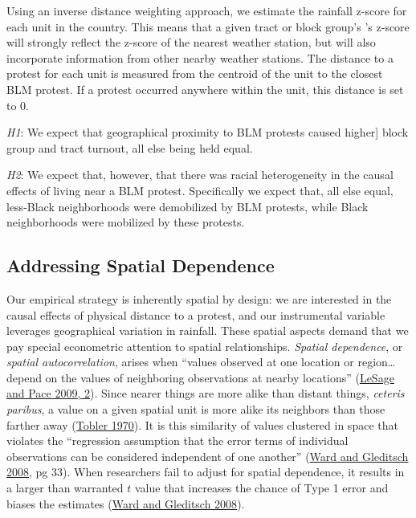 \documentclass[
  12pt,
]{article}
\begin{document}
Using an inverse distance weighting approach, we estimate the rainfall z-score for each unit in the country. This means that a given tract or block group's 's z-score will strongly reflect the z-score of the nearest weather station, but will also incorporate information from other nearby weather stations. The distance to a protest for each unit is measured from the centroid of the unit to the closest BLM protest. If a protest occurred anywhere within the unit, this distance is set to 0.

\emph{H1}: We expect that geographical proximity to BLM protests caused higher{]} block group and tract turnout, all else being held equal.

\emph{H2}: We expect that, however, that there was racial heterogeneity in the causal effects of living near a BLM protest. Specifically we expect that, all else equal, less-Black neighborhoods were demobilized by BLM protests, while Black neighborhoods were mobilized by these protests.

\hypertarget{addressing-spatial-dependence}{%
\subsection*{Addressing Spatial Dependence}\label{addressing-spatial-dependence}}

Our empirical strategy is inherently spatial by design: we are interested in the causal effects of physical distance to a protest, and our instrumental variable leverages geographical variation in rainfall. These spatial aspects demand that we pay special econometric attention to spatial relationships. \emph{Spatial dependence}, or \emph{spatial autocorrelation}, arises when ``values observed at one location or region\ldots{} depend on the values of neighboring observations at nearby locations'' (\protect\hyperlink{ref-LeSage2009}{LeSage and Pace 2009, 2}). Since nearer things are more alike than distant things, \emph{ceteris paribus}, a value on a given spatial unit is more alike its neighbors than those farther away (\protect\hyperlink{ref-Tobler1970}{Tobler 1970}). It is this similarity of values clustered in space that violates the ``regression assumption that the error terms of individual observations can be considered independent of one another'' (\protect\hyperlink{ref-Ward2008}{Ward and Gleditsch 2008}, pg 33). When researchers fail to adjust for spatial dependence, it results in a larger than warranted \(t\) value that increases the chance of Type 1 error and biases the estimates (\protect\hyperlink{ref-Ward2008}{Ward and Gleditsch 2008}).
\end{document}

